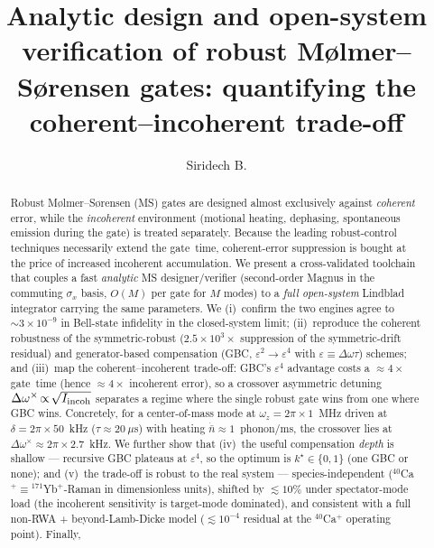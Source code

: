 \documentclass[aps,prapplied,twocolumn,superscriptaddress,floatfix,nofootinbib]{revtex4-2}
\begin{document}
\title{Analytic design and open-system verification of robust M\o lmer--S\o rensen
gates: quantifying the coherent--incoherent trade-off}

\author{Siridech B.}

\begin{abstract}
Robust M\o lmer--S\o rensen (MS) gates are designed almost exclusively against
\emph{coherent} error, while the \emph{incoherent} environment (motional heating,
dephasing, spontaneous emission during the gate) is treated separately. Because the
leading robust-control techniques necessarily extend the gate~time, coherent-error
suppression is bought at the price of increased incoherent accumulation. We present a
cross-validated toolchain that couples a fast \emph{analytic} MS designer/verifier
(second-order Magnus in the commuting $\sigma_x$ basis, $O(M)$ per gate for $M$ modes)
to a \emph{full open-system} Lindblad integrator carrying the same parameters. We
(i)~confirm the two engines agree to $\sim\!3\times10^{-9}$ in Bell-state infidelity in
the closed-system limit; (ii)~reproduce the coherent robustness of the symmetric-robust
($2.5\times10^{3}\times$ suppression of the symmetric-drift residual) and generator-based
compensation (GBC, $\varepsilon^2\!\to\!\varepsilon^4$ with $\varepsilon\equiv\Delta\omega\tau$)
schemes; and (iii)~map the coherent--incoherent trade-off: GBC's $\varepsilon^4$ advantage
costs a $\approx\!4\times$ gate~time (hence $\approx\!4\times$ incoherent error), so a
crossover asymmetric detuning $\Delta\omega^\times\!\propto\!\sqrt{I_{\rm incoh}}$ separates
a regime where the single robust gate wins from one where GBC wins. Concretely, for a
center-of-mass mode at $\omega_z=2\pi\times1$~MHz driven at $\delta=2\pi\times50$~kHz
($\tau\approx20~\mu$s) with heating $\dot{\bar n}\approx1$~phonon/ms, the crossover lies at
$\Delta\omega^\times\approx2\pi\times2.7$~kHz. We further show that (iv)~the useful
compensation \emph{depth} is shallow --- recursive GBC plateaus at $\varepsilon^4$, so the
optimum is $k^\star\!\in\!\{0,1\}$ (one GBC or none); and (v)~the trade-off is robust to the
real system --- species-independent (${}^{40}$Ca$^+\!\equiv\!{}^{171}$Yb$^+$-Raman in
dimensionless units), shifted by $\lesssim\!10\%$ under spectator-mode load (the incoherent
sensitivity is target-mode dominated), and consistent with a full non-RWA + beyond-Lamb-Dicke
model ($\lesssim\!10^{-4}$ residual at the ${}^{40}$Ca$^+$ operating point). Finally,

\end{abstract}
\end{document}
